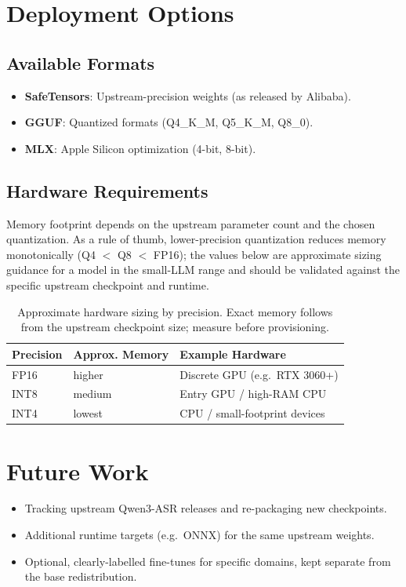 \documentclass[11pt,a4paper]{article}
\begin{document}
\section{Deployment Options}

\subsection{Available Formats}
\begin{itemize}
    \item \textbf{SafeTensors}: Upstream-precision weights (as released by Alibaba).
    \item \textbf{GGUF}: Quantized formats (Q4\_K\_M, Q5\_K\_M, Q8\_0).
    \item \textbf{MLX}: Apple Silicon optimization (4-bit, 8-bit).
\end{itemize}

\subsection{Hardware Requirements}

Memory footprint depends on the upstream parameter count and the chosen quantization.
As a rule of thumb, lower-precision quantization reduces memory monotonically (Q4
$<$ Q8 $<$ FP16); the values below are approximate sizing guidance for a model in the
small-LLM range and should be validated against the specific upstream checkpoint and
runtime.

\begin{table}[H]
\centering
\begin{tabular}{lll}
\toprule
\textbf{Precision} & \textbf{Approx. Memory} & \textbf{Example Hardware} \\
\midrule
FP16 & higher & Discrete GPU (e.g.\ RTX 3060+) \\
INT8 & medium & Entry GPU / high-RAM CPU \\
INT4 & lowest & CPU / small-footprint devices \\
\bottomrule
\end{tabular}
\caption{Approximate hardware sizing by precision. Exact memory follows from the
upstream checkpoint size; measure before provisioning.}
\end{table}

\section{Future Work}

\begin{itemize}
    \item Tracking upstream Qwen3-ASR releases and re-packaging new checkpoints.
    \item Additional runtime targets (e.g.\ ONNX) for the same upstream weights.
    \item Optional, clearly-labelled fine-tunes for specific domains, kept separate
          from the base redistribution.
\end{itemize}
\end{document}
